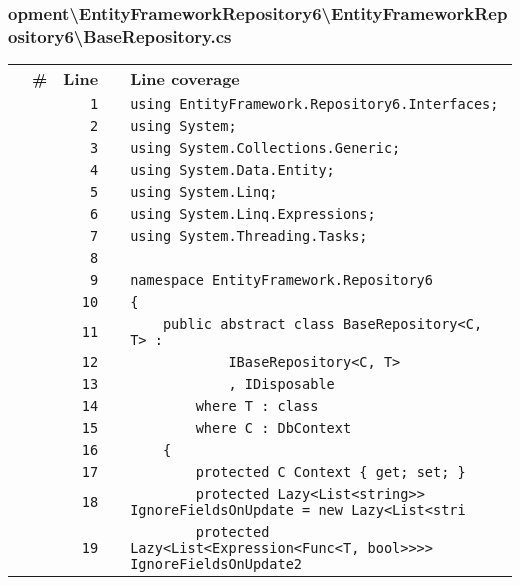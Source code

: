 \documentclass[a4paper,10pt]{article}
\begin{document}
\subsubsection{opment\textbackslash EntityFrameworkRepository6\textbackslash EntityFrameworkRepository6\textbackslash BaseRepository.cs}
\begin{longtable}[l]{lrrll}
\textbf{} & \textbf{\#} & \textbf{Line} & \textbf{} & \textbf{Line coverage}\\
\cellcolor{gray} &  & \verb~1~ & & \verb~using EntityFramework.Repository6.Interfaces;~\\
\cellcolor{gray} &  & \verb~2~ & & \verb~using System;~\\
\cellcolor{gray} &  & \verb~3~ & & \verb~using System.Collections.Generic;~\\
\cellcolor{gray} &  & \verb~4~ & & \verb~using System.Data.Entity;~\\
\cellcolor{gray} &  & \verb~5~ & & \verb~using System.Linq;~\\
\cellcolor{gray} &  & \verb~6~ & & \verb~using System.Linq.Expressions;~\\
\cellcolor{gray} &  & \verb~7~ & & \verb~using System.Threading.Tasks;~\\
\cellcolor{gray} &  & \verb~8~ & & \verb~~\\
\cellcolor{gray} &  & \verb~9~ & & \verb~namespace EntityFramework.Repository6~\\
\cellcolor{gray} &  & \verb~10~ & & \verb~{~\\
\cellcolor{gray} &  & \verb~11~ & & \verb~    public abstract class BaseRepository<C, T> :~\\
\cellcolor{gray} &  & \verb~12~ & & \verb~            IBaseRepository<C, T>~\\
\cellcolor{gray} &  & \verb~13~ & & \verb~            , IDisposable~\\
\cellcolor{gray} &  & \verb~14~ & & \verb~        where T : class~\\
\cellcolor{gray} &  & \verb~15~ & & \verb~        where C : DbContext~\\
\cellcolor{gray} &  & \verb~16~ & & \verb~    {~\\
\cellcolor{gray} &  & \verb~17~ & & \verb~        protected C Context { get; set; }~\\
\cellcolor{gray} &  & \verb~18~ & & \verb~        protected Lazy<List<string>> IgnoreFieldsOnUpdate = new Lazy<List<stri~\\
\cellcolor{gray} &  & \verb~19~ & & \verb~        protected Lazy<List<Expression<Func<T, bool>>>> IgnoreFieldsOnUpdate2 ~\\

\end{longtable}
\end{document}

